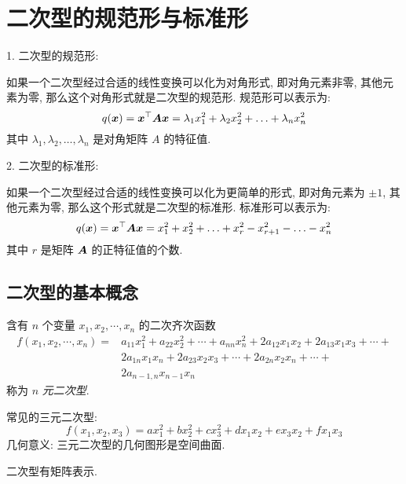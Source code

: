 \section{二次型的规范形与标准形}

1. 二次型的规范形:

如果一个二次型经过合适的线性变换可以化为对角形式, 即对角元素非零, 其他元素为零, 那么这个对角形式就是二次型的规范形. 规范形可以表示为:
$$
q(\vb*{x}) = \vb*{x}^{\top} \vb*{A x} = \lambda_1 x_1^2 + \lambda_2 x_2^2 + \ldots + \lambda_n x_n^2
$$
其中 $\lambda_1, \lambda_2, \ldots, \lambda_n$ 是对角矩阵 $A$ 的特征值. 

2. 二次型的标准形:

如果一个二次型经过合适的线性变换可以化为更简单的形式, 即对角元素为 $\pm 1$, 其他元素为零, 那么这个形式就是二次型的标准形. 标准形可以表示为:
$$
q(\vb*{x}) = \vb*{x}^{\top} \vb*{A x} = x_1^2 + x_2^2 + \ldots + x_r^2 - x_{r+1}^2 - \ldots - x_n^2
$$
其中 $r$ 是矩阵 $\vb*{A}$ 的正特征值的个数. 

\subsection{二次型的基本概念}

\begin{definition}[$n$ 元二次型]
    含有 $ n $ 个变量 $ x_{1}, x_{2}, \cdots, x_{n} $ 的二次齐次函数
    $$\begin{aligned}
            f\left(x_{1}, x_{2}, \cdots, x_{n}\right)= & a_{11} x_{1}^{2}+a_{22} x_{2}^{2}+\cdots+a_{n n} x_{n}^{2}+2 a_{12} x_{1} x_{2}+2 a_{13} x_{1} x_{3}+\cdots+ \\
                                                       & 2 a_{1 n} x_{1} x_{n}+2 a_{23} x_{2} x_{3}+\cdots+2 a_{2 n} x_{2} x_{n}+\cdots+                              \\
                                                       & 2 a_{n-1, n} x_{n-1} x_{n}
        \end{aligned}$$
    称为 $ n $ \textit{元二次型}.
\end{definition}

常见的三元二次型:
$$f\left(x_{1}, x_{2}, x_{3}\right)= a x_{1}^{2}+b x_{2}^{2}+c x_{3}^{2}+d x_{1} x_{2}+e x_{3} x_{2}+f x_{1} x_{3}$$
几何意义: 三元二次型的几何图形是空间曲面.

二次型有矩阵表示.

